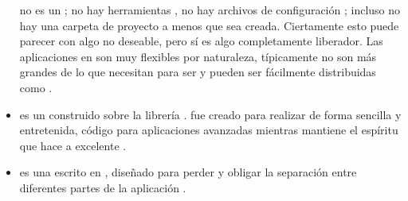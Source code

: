 \begin{itemize}
				\sinatraNAME no es un \frameworkPC; no hay herramientas \builtINPL \ormAS, no hay archivos de configuración \preFabCPT; incluso no hay una carpeta de proyecto a menos que sea creada. Ciertamente esto puede parecer con algo no deseable, pero sí es algo completamente liberador. Las aplicaciones en \sinatraNAME son muy flexibles por naturaleza, típicamente no son más grandes de lo que necesitan para ser y pueden ser fácilmente distribuidas como \rubyGemsAS  \cite{book_sinatra_oreilly}.



			\item
				\textbf{\padrinoNAME} es un \frameworkPC construido sobre la librería \webINT \sinatraNAME.  \padrinoNAME fue creado para realizar de forma sencilla y entretenida, código para aplicaciones \webINT avanzadas mientras mantiene el espíritu que hace a \sinatraNAME excelente \cite{online_technology_padrino_officialsite}.

			
			\item
				\textbf{\djangoNAME} es una \frameworkPC \openSourcePC escrito en \pythonNAME, diseñado para perder \couplingAS y obligar la separación entre diferentes partes de la aplicación \cite{online_book_django_developmentpattern}.



\end{itemize}
